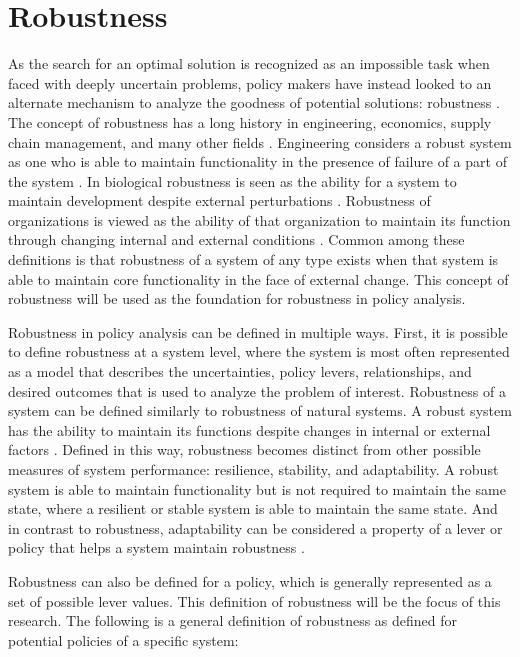 \section{Robustness}\label{review-robustness}
As the search for an optimal solution is recognized as an impossible task when faced with deeply uncertain problems, policy makers have instead looked to an alternate mechanism to analyze the goodness of potential solutions: robustness \citep{Maier2016}. The concept of robustness has a long history in engineering, economics, supply chain management, and many other fields \citep{Capano2017, Maier2016}. Engineering considers a robust system as one who is able to maintain functionality in the presence of failure of a part of the system \citep{Capano2017}. In biological robustness is seen as the ability for a system to maintain development despite external perturbations \citep{Jen2003}. Robustness of organizations is viewed as the ability of that organization to maintain its function through changing internal and external conditions \citep{Capano2017}. Common among these definitions is that robustness of a system of any type exists when that system is able to maintain core functionality in the face of external change. This concept of robustness will be used as the foundation for robustness in policy analysis. 

Robustness in policy analysis can be defined in multiple ways. First, it is possible to define robustness at a system level, where the system is most often represented as a model that describes the uncertainties, policy levers, relationships, and desired outcomes that is used to analyze the problem of interest. Robustness of a system can be defined similarly to robustness of natural systems. A robust system has the ability to maintain its functions despite changes in internal or external factors \citep{Capano2017}. Defined in this way, robustness becomes distinct from other possible measures of system performance: resilience, stability, and adaptability. A robust system is able to maintain functionality but is not required to maintain the same state, where a resilient or stable system is able to maintain the same state. And in contrast to robustness, adaptability can be considered a property of a lever or policy that helps a system maintain robustness \citep{Capano2017}. 

Robustness can also be defined for a policy, which is generally represented as a set of possible lever values. This definition of robustness will be the focus of this research. The following is a general definition of robustness as defined for potential policies of a specific system: 


